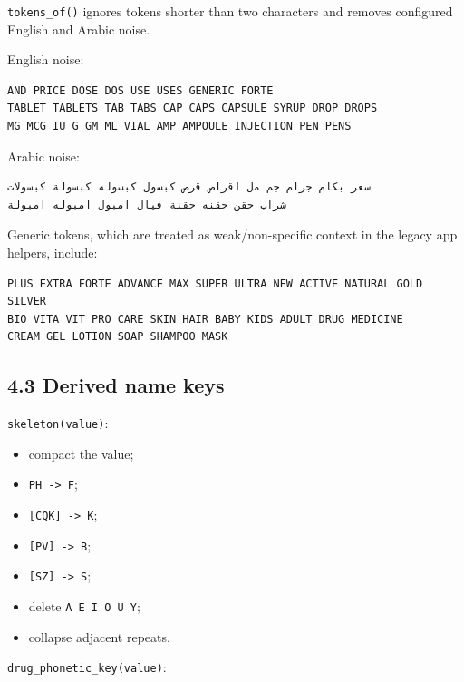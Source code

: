 \texttt{tokens\_\allowbreak{}of()} ignores tokens shorter than two characters and removes configured English and Arabic noise.

English noise:

\begin{verbatim}
AND PRICE DOSE DOS USE USES GENERIC FORTE
TABLET TABLETS TAB TABS CAP CAPS CAPSULE SYRUP DROP DROPS
MG MCG IU G GM ML VIAL AMP AMPOULE INJECTION PEN PENS
\end{verbatim}

Arabic noise:

\begin{verbatim}
سعر بكام جرام جم مل اقراص قرص كبسول كبسوله كبسولة كبسولات
شراب حقن حقنه حقنة فيال امبول امبوله امبولة
\end{verbatim}

Generic tokens, which are treated as weak/non-specific context in the legacy app helpers, include:

\begin{verbatim}
PLUS EXTRA FORTE ADVANCE MAX SUPER ULTRA NEW ACTIVE NATURAL GOLD SILVER
BIO VITA VIT PRO CARE SKIN HAIR BABY KIDS ADULT DRUG MEDICINE
CREAM GEL LOTION SOAP SHAMPOO MASK
\end{verbatim}

\subsection{4.3 Derived name keys}\label{43-derived-name-keys}

\texttt{skeleton(value)}:

\begin{itemize}
\tightlist
\item
  compact the value;
\item
  \texttt{PH\ -\textgreater{}\ F};
\item
  \texttt{{[}CQK{]}\ -\textgreater{}\ K};
\item
  \texttt{{[}PV{]}\ -\textgreater{}\ B};
\item
  \texttt{{[}SZ{]}\ -\textgreater{}\ S};
\item
  delete \texttt{A\ E\ I\ O\ U\ Y};
\item
  collapse adjacent repeats.
\end{itemize}

\texttt{drug\_\allowbreak{}phonetic\_\allowbreak{}key(value)}:

